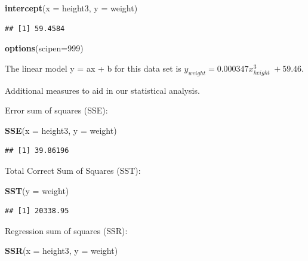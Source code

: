\documentclass[]{article}
\newenvironment{Shaded}{\begin{snugshade}}{\end{snugshade}}
\newcommand{\KeywordTok}[1]{\textcolor[rgb]{0.13,0.29,0.53}{\textbf{{#1}}}}
\newcommand{\DataTypeTok}[1]{\textcolor[rgb]{0.13,0.29,0.53}{{#1}}}
\newcommand{\DecValTok}[1]{\textcolor[rgb]{0.00,0.00,0.81}{{#1}}}
\newcommand{\NormalTok}[1]{{#1}}
\begin{document}
\begin{Shaded}
\begin{Highlighting}[]
\KeywordTok{intercept}\NormalTok{(}\DataTypeTok{x =} \NormalTok{height3, }\DataTypeTok{y =} \NormalTok{weight)}
\end{Highlighting}
\end{Shaded}

\begin{verbatim}
## [1] 59.4584
\end{verbatim}

\begin{Shaded}
\begin{Highlighting}[]
\KeywordTok{options}\NormalTok{(}\DataTypeTok{scipen=}\DecValTok{999}\NormalTok{)}
\end{Highlighting}
\end{Shaded}

The linear model y = ax + b for this data set is
\(y_{weight} = 0.000347x^3_{height}~+59.46\).

Additional measures to aid in our statistical analysis.

Error sum of squares (SSE):

\begin{Shaded}
\begin{Highlighting}[]
\KeywordTok{SSE}\NormalTok{(}\DataTypeTok{x =} \NormalTok{height3, }\DataTypeTok{y =} \NormalTok{weight)}
\end{Highlighting}
\end{Shaded}

\begin{verbatim}
## [1] 39.86196
\end{verbatim}

Total Correct Sum of Squares (SST):

\begin{Shaded}
\begin{Highlighting}[]
\KeywordTok{SST}\NormalTok{(}\DataTypeTok{y =} \NormalTok{weight)}
\end{Highlighting}
\end{Shaded}

\begin{verbatim}
## [1] 20338.95
\end{verbatim}

Regression sum of squares (SSR):

\begin{Shaded}
\begin{Highlighting}[]
\KeywordTok{SSR}\NormalTok{(}\DataTypeTok{x =} \NormalTok{height3, }\DataTypeTok{y =} \NormalTok{weight)}
\end{Highlighting}
\end{Shaded}
\end{document}
